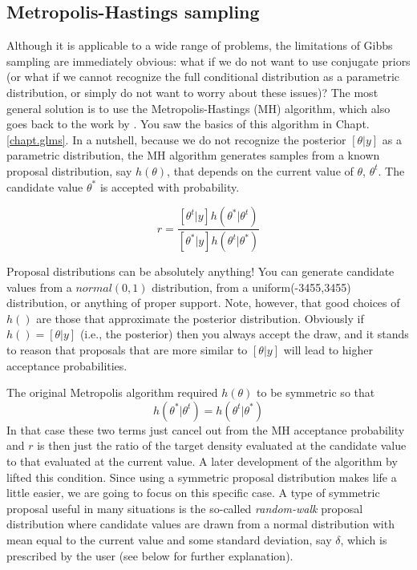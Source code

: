 \subsection{ Metropolis-Hastings sampling   }
\label{mcmc.sec.mh}

Although it is applicable to a wide range of problems, the limitations
of Gibbs sampling are immediately obvious: what if we do not want to
use conjugate priors (or what if we cannot recognize the full
conditional distribution as a parametric distribution, or simply do
not want to worry about these issues)? The most general solution is to
use the Metropolis-Hastings (MH) algorithm, which also goes back to
the work by \citet{metropolis_ulam:1953}. You saw the basics of this
algorithm in Chapt. \ref{chapt.glms}. In a nutshell, because we do not recognize the
posterior $[\theta|y]$ as a parametric distribution, the MH algorithm
generates samples from a known proposal distribution, say $h(\theta)$,
that depends on the current value of $\theta$,  $\theta^t$. The candidate value $\theta^*$ is accepted with probability. 

\[
r = \frac{ [\theta^{t}|y] h(\theta^{*}|\theta^{t})}
    {[\theta^{*}|y] h(\theta^{t}|\theta^{*}) }
\]

Proposal distributions can be absolutely
anything!  You can generate candidate values from a $normal(0,1)$
distribution, from a uniform(-3455,3455) distribution, or anything of
proper support.  Note, however, that good choices of $h()$ are those
that approximate the posterior distribution. Obviously if $h() =
[\theta|y]$ (i.e., the posterior) then you always accept the draw,
and it stands to reason that proposals that are more similar to
$[\theta|y]$ will lead to higher acceptance probabilities. 

The original Metropolis algorithm
required $h(\theta)$ to be symmetric so that
\[
h(\theta^{*}|\theta^{t}) = h(\theta^{t}|\theta^{*})
\]
In that case these two terms just cancel
out from the MH acceptance probability and $r$ is then just the ratio
of the target density evaluated at the candidate value to that
evaluated at the current value. A later
development of the algorithm by \citet{hastings:1970} lifted this
condition. 
Since using a symmetric proposal distribution makes life a little
easier, we are going to focus on this specific case. A type of symmetric proposal useful in many situations is the
so-called {\it random-walk} proposal distribution where candidate values
are drawn from a normal distribution with mean equal to the current
value and some standard deviation, say $\delta$, which is prescribed by
the user (see below for further explanation). 

